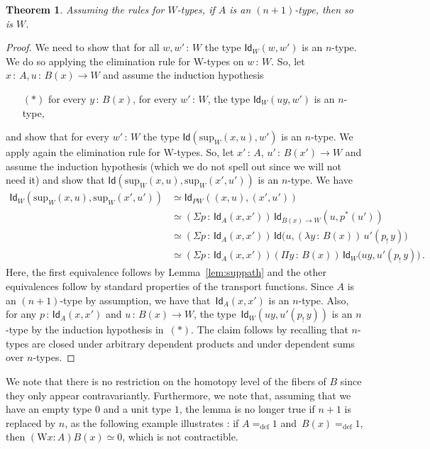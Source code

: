 \documentclass[10pt,a4paper,oneside,reqno]{amsart}
\numberwithin{equation}{section}
\theoremstyle{mythm}
\newtheorem{theorem}{Theorem}[section]
\theoremstyle{mydef}
\theoremstyle{myrmk}
\newcommand{\defeq}{=_{\mathrm{def}}}
\newcommand{\co}{\,{:}\,}
\newcommand{\Id}{\mathsf{Id}}
\newcommand{\W}{\mathrm{W}}
\renewcommand{\sup}{\mathrm{sup}}
\begin{document}
\begin{theorem}\label{thm:Whlevel} Assuming the rules for $W$-types,
if $A$ is an $(n+1)$-type, then so is $W$.
\end{theorem}


\begin{proof}
We need to show that for all $w, w' \co W$ the type $\Id_W(w, w')$ is an $n$-type. We do so applying the elimination
rule for W-types on $w \co W$.  So, let $x \co A, u \co B(x) \to W$ and assume the induction hypothesis 
\begin{itemize}
\item[$(\ast)$] for every $y \co B(x)$, for every $w' \co W$,  the type $\Id_W( uy ,w')$ is an $n$-type, 
\end{itemize}
and show that for every $w' \co W$ the type $\Id(\sup_W(x,u), w')$ is an $n$-type. We apply again the elimination rule for W-types. So, let   $x' \co A$, $u' \co B(x') \to W$ and assume the induction hypothesis (which we do not spell out since we will not need it) and show that $\Id( \sup_W(x,u) , \sup_W(x',u'))$ is an $n$-type. We have
\begin{align*} 
\Id_W(\sup_W(x,u), \sup_W(x',u'))
& \simeq \Id_{PW}((x,u) , (x',u')) \\
& \simeq (\Sigma p \co \Id_A(x, x')) \, \Id_{B(x) \to W}( u , p^*(u') )   \\
& \simeq (\Sigma p \co \Id_A(x,x')) \,  \Id\big(u , (\lambda y \co B(x)) \,  u'( p_{!} \, y)\big) \\
& \simeq (\Sigma p \co \Id_A(x,x')) (\Pi y \co B(x)) \, \Id_W \big( uy  , u'(p_{!} \, y)\big) \, .
\end{align*}
Here, the first equivalence follows by Lemma~\ref{lem:suppath} and the other equivalences follow by standard
properties of the transport functions. Since $A$ is an $(n+1)$-type by assumption, we have 
that~$\Id_A(x,x')$ is an $n$-type. Also, for any $p \co \Id_A(x,x')$ and $u \co B(x) \to W$, the 
type~$\Id_W(uy ,  u'(p_{!} \, y))$ is an $n$-type by the 
induction 
hypothesis in~$(\ast)$. The claim follows by recalling that $n$-types are closed under arbitrary dependent products and under dependent 
sums over $n$-types. 
\end{proof}

We note that there is no restriction on the homotopy level of the fibers of $B$ since they only appear contravariantly. Furthermore, we note that, assuming that we have an empty type $0$ and a unit type $1$,
 the lemma is no longer true if $n+1$ is replaced by $n$, as the following example
illustrates : if $A \defeq 1$ and~$B(x) \defeq 1$, then $(\W x:A) B(x) \simeq 0$, which is not contractible. 
\end{document}
